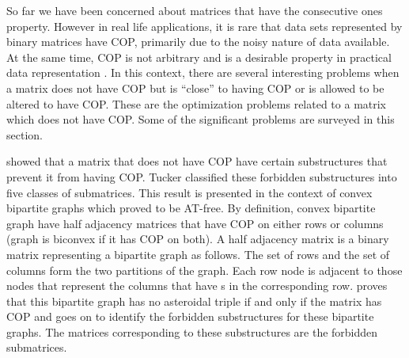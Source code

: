 {So far we have been concerned about matrices that have the consecutive
ones property. However in real life applications, it is rare that data
sets represented by binary matrices have COP, primarily due to the
noisy nature of data available. At the same time, COP is not arbitrary
and is a desirable property in practical data representation
\cite{co98,jkckv04,k77}. In this context, there are several
interesting problems when a matrix does not have COP but is ``close''
to having COP or is allowed to be altered to have COP. These are the
optimization problems related to a matrix which does not have
COP. Some of the significant problems are surveyed in this section.

 \cite{at72} showed that a matrix that
does not have COP have certain substructures that prevent it from
having COP. Tucker classified these forbidden substructures into five
classes of submatrices. This result is presented in the context of
convex bipartite graphs which \cite{at72} proved to be
AT-free. By
definition, convex bipartite graph have half adjacency matrices that
have COP on either rows or columns (graph is biconvex if it has COP on
both)\cite{d08phd}. A half adjacency matrix is a binary matrix
representing a bipartite graph as follows. The set of rows and the set
of columns form the two partitions of the graph. Each row node is
adjacent to those nodes that represent the columns that have {\un}s in
the corresponding row. \cite{at72} proves that this bipartite graph
has no asteroidal triple if and only if the matrix has COP and goes on
to identify the forbidden substructures for these bipartite
graphs. The matrices corresponding to these substructures are the
forbidden submatrices.

}
